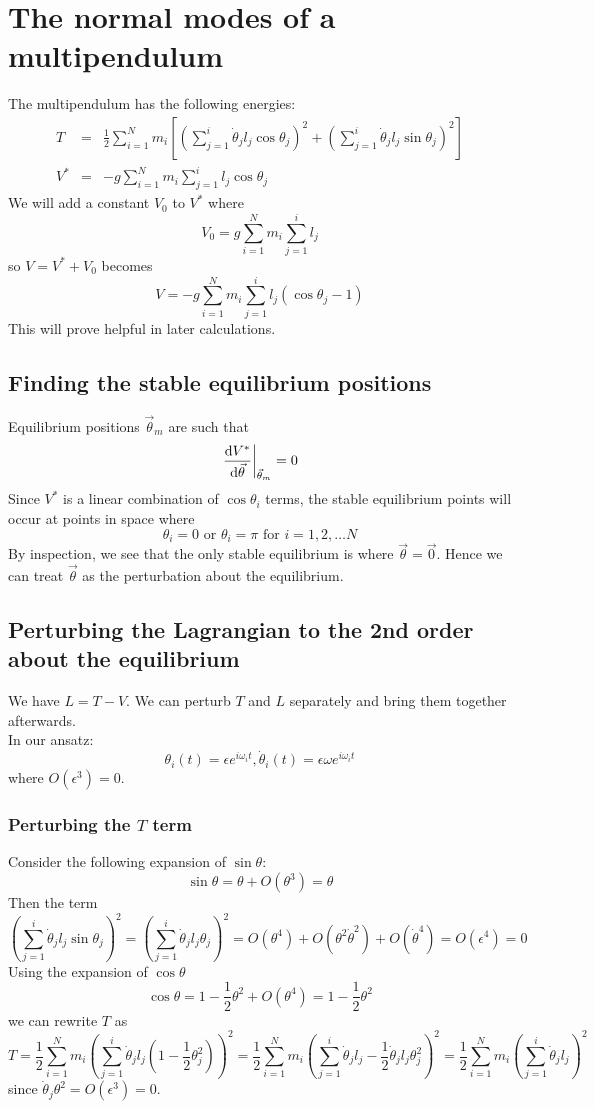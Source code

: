 \documentclass[12pt]{article}
\begin{document}
	\section{The normal modes of a multipendulum}
	
	The multipendulum has the following energies:
	\begin{eqnarray*}
	T &=& \frac{1}{2}\sum_{i=1}^N m_i\left[\left(\sum_{j=1}^i \dot{\theta}_jl_j\cos{\theta_j}\right)^2+\left(\sum_{j=1}^i \dot{\theta}_jl_j\sin{\theta_j}\right)^2\right]\\
	V^* &=& -g\sum_{i=1}^N m_i\sum_{j=1}^i l_j\cos{\theta_j}
	\end{eqnarray*}
	We will add a constant $V_0$ to $V^*$ where
	$$V_0=g\sum_{i=1}^N m_i\sum_{j=1}^i l_j$$
	so $V=V^*+V_0$ becomes
	$$V = -g\sum_{i=1}^N m_i\sum_{j=1}^i l_j\left(\cos{\theta_j}-1\right)$$
	This will prove helpful in later calculations.
	
	\subsection{Finding the stable equilibrium positions}
	Equilibrium positions $\vec{\theta}_m$ are such that
	$$\eval{\dv{V^*}{\vec{\theta}}}_{\vec{\theta}_m}=0$$
	Since $V^*$ is a linear combination of $\cos{\theta_i}$ terms, the stable equilibrium points will occur at points in space where
	$$\theta_i=0 \mbox{ or } \theta_i=\pi \mbox{ for } i = 1, 2,\dots N$$
	By inspection, we see that the only stable equilibrium is where $\vec{\theta}=\vec{0}$. Hence we can treat $\vec{\theta}$ as the perturbation about the equilibrium.
	
	\subsection{Perturbing the Lagrangian to the 2nd order about the equilibrium}	
	We have $L = T - V$. We can perturb $T$ and $L$ separately and bring them together afterwards.\\
	In our ansatz:
	$$\theta_i(t)=\epsilon e^{i\omega_i t},\dot{\theta}_i(t)=\epsilon\omega e^{i\omega_i t}$$
	where $O(\epsilon^3)=0$.
	\subsubsection{Perturbing the $T$ term}
	Consider the following expansion of $\sin{\theta}$:
	$$\sin{\theta}=\theta+O(\theta^3)=\theta$$
	Then the term
	$$\left(\sum_{j=1}^i \dot{\theta}_jl_j\sin{\theta_j}\right)^2=\left(\sum_{j=1}^i \dot{\theta}_jl_j\theta_j\right)^2=O(\theta^4)+O(\theta^2\dot{\theta}^2)+O(\dot{\theta}^4)=O(\epsilon^4)=0$$
	Using the expansion of $\cos{\theta}$
	$$\cos{\theta}=1-\frac{1}{2}\theta^2+O(\theta^4)=1-\frac{1}{2}\theta^2$$
	we can rewrite $T$ as
	$$T=\frac{1}{2}\sum_{i=1}^N m_i\left(\sum_{j=1}^i \dot{\theta}_jl_j\left(1-\frac{1}{2}\theta_j^2\right)\right)^2=\frac{1}{2}\sum_{i=1}^N m_i\left(\sum_{j=1}^i \dot{\theta}_jl_j-\frac{1}{2}\dot{\theta}_jl_j\theta_j^2\right)^2=\frac{1}{2}\sum_{i=1}^N m_i\left(\sum_{j=1}^i \dot{\theta}_jl_j\right)^2$$
	since $\dot{\theta}_j\theta^2=O(\epsilon^3)=0$.
	
\end{document}
